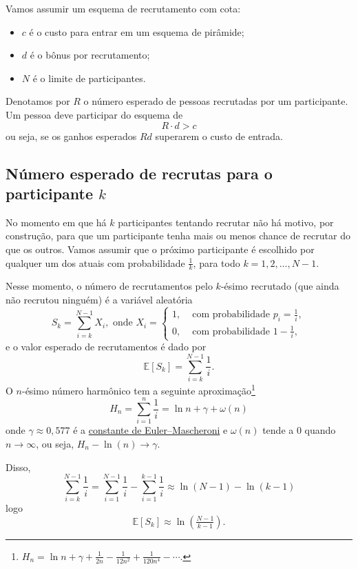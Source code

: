 \documentclass[a4paper,12pt]{article}
\begin{document}
Vamos assumir um esquema de recrutamento com cota:
\begin{itemize}[noitemsep]
\item $c$ é o custo para entrar em um esquema de pirâmide;
\item $d$ é o bônus por recrutamento;
\item $N$ é o limite de participantes.
\end{itemize}

Denotamos por $R$ o número esperado de pessoas recrutadas por um
participante. Um pessoa deve participar do esquema de $$R\cdot d > c$$
ou seja, se os ganhos esperados $Rd$ superarem o custo de entrada.

\subsection*{Número esperado de recrutas para o participante $k$}

No momento em que há $k$ participantes tentando recrutar não há motivo,
por construção, para que um participante tenha mais ou menos chance de
recrutar do que os outros. Vamos assumir que o próximo participante é
escolhido por qualquer um dos atuais com probabilidade $\tfrac 1k$,
para todo $k=1,2,\dots,N-1$.

Nesse momento, o número de recrutamentos pelo $k$-ésimo recrutado (que
ainda não recrutou ninguém) é a variável aleatória
\[
  S_k = \sum_{i=k}^{N-1} X_i, \text{ onde }
  X_i = 
  \begin{cases}
    1, & \text{ com probabilidade } p_i= \tfrac 1i,\\
    0, & \text{ com probabilidade } 1- \tfrac 1i,
  \end{cases}
\]
e o valor esperado de recrutamentos é dado por
\begin{equation}
  \mathbb E[S_k] = \sum_{i=k}^{N-1} \frac{1}{i}.
\end{equation}
O $n$-ésimo número harmônico tem a seguinte
aproximação\footnote{$H_n = \ln n + \gamma + \frac{1}{2n} -
  \frac{1}{12n^2} + \frac{1}{120n^4} - \cdots $.}
\[
  H_n= \sum_{i=1}^n \frac 1i = \ln n+ \gamma  + \omega(n) 
\]
onde $\gamma\approx 0,577$ é a
\href{http://en.wikipedia.org/wiki/Euler\%E2\%80\%93Mascheroni_constant}{constante
  de Euler--Mascheroni} e $\omega(n)$ tende a $0$ quando $n\to \infty$,
ou seja, $H_n - \ln(n) \to \gamma$.

Disso,
\[
  \sum_{i=k}^{N-1} \frac{1}{i} =
  \sum_{i=1}^{N-1} \frac{1}{i} -
  \sum_{i=1}^{k-1} \frac{1}{i}
  \approx
  \ln(N-1) - \ln(k-1) 
\]
logo
\begin{equation}\label{eq:harmonico}
  \mathbb E[S_k]  \approx\ln\left( \tfrac{N-1}{k-1}\right).
\end{equation}
\end{document}

